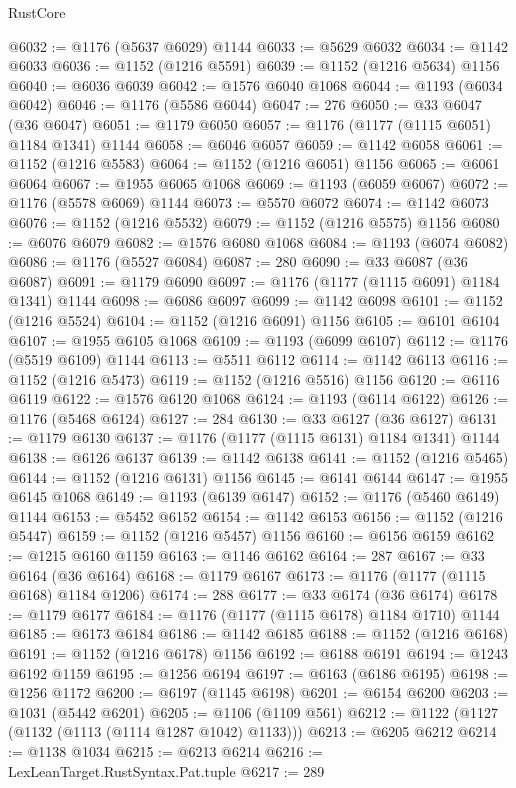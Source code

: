 \begin{lexlean}{RustCore}
\begin{coremodule}
@6032 := @1176 (@5637 @6029) @1144
@6033 := @5629 @6032
@6034 := @1142 @6033
@6036 := @1152 (@1216 @5591)
@6039 := @1152 (@1216 @5634) @1156
@6040 := @6036 @6039
@6042 := @1576 @6040 @1068
@6044 := @1193 (@6034 @6042)
@6046 := @1176 (@5586 @6044)
@6047 := 276
@6050 := @33 @6047 (@36 @6047)
@6051 := @1179 @6050
@6057 := @1176 (@1177 (@1115 @6051) @1184 @1341) @1144
@6058 := @6046 @6057
@6059 := @1142 @6058
@6061 := @1152 (@1216 @5583)
@6064 := @1152 (@1216 @6051) @1156
@6065 := @6061 @6064
@6067 := @1955 @6065 @1068
@6069 := @1193 (@6059 @6067)
@6072 := @1176 (@5578 @6069) @1144
@6073 := @5570 @6072
@6074 := @1142 @6073
@6076 := @1152 (@1216 @5532)
@6079 := @1152 (@1216 @5575) @1156
@6080 := @6076 @6079
@6082 := @1576 @6080 @1068
@6084 := @1193 (@6074 @6082)
@6086 := @1176 (@5527 @6084)
@6087 := 280
@6090 := @33 @6087 (@36 @6087)
@6091 := @1179 @6090
@6097 := @1176 (@1177 (@1115 @6091) @1184 @1341) @1144
@6098 := @6086 @6097
@6099 := @1142 @6098
@6101 := @1152 (@1216 @5524)
@6104 := @1152 (@1216 @6091) @1156
@6105 := @6101 @6104
@6107 := @1955 @6105 @1068
@6109 := @1193 (@6099 @6107)
@6112 := @1176 (@5519 @6109) @1144
@6113 := @5511 @6112
@6114 := @1142 @6113
@6116 := @1152 (@1216 @5473)
@6119 := @1152 (@1216 @5516) @1156
@6120 := @6116 @6119
@6122 := @1576 @6120 @1068
@6124 := @1193 (@6114 @6122)
@6126 := @1176 (@5468 @6124)
@6127 := 284
@6130 := @33 @6127 (@36 @6127)
@6131 := @1179 @6130
@6137 := @1176 (@1177 (@1115 @6131) @1184 @1341) @1144
@6138 := @6126 @6137
@6139 := @1142 @6138
@6141 := @1152 (@1216 @5465)
@6144 := @1152 (@1216 @6131) @1156
@6145 := @6141 @6144
@6147 := @1955 @6145 @1068
@6149 := @1193 (@6139 @6147)
@6152 := @1176 (@5460 @6149) @1144
@6153 := @5452 @6152
@6154 := @1142 @6153
@6156 := @1152 (@1216 @5447)
@6159 := @1152 (@1216 @5457) @1156
@6160 := @6156 @6159
@6162 := @1215 @6160 @1159
@6163 := @1146 @6162
@6164 := 287
@6167 := @33 @6164 (@36 @6164)
@6168 := @1179 @6167
@6173 := @1176 (@1177 (@1115 @6168) @1184 @1206)
@6174 := 288
@6177 := @33 @6174 (@36 @6174)
@6178 := @1179 @6177
@6184 := @1176 (@1177 (@1115 @6178) @1184 @1710) @1144
@6185 := @6173 @6184
@6186 := @1142 @6185
@6188 := @1152 (@1216 @6168)
@6191 := @1152 (@1216 @6178) @1156
@6192 := @6188 @6191
@6194 := @1243 @6192 @1159
@6195 := @1256 @6194
@6197 := @6163 (@6186 @6195)
@6198 := @1256 @1172
@6200 := @6197 (@1145 @6198)
@6201 := @6154 @6200
@6203 := @1031 (@5442 @6201)
@6205 := @1106 (@1109 @561)
@6212 := @1122 (@1127 (@1132 (@1113 (@1114 @1287 @1042) @1133)))
@6213 := @6205 @6212
@6214 := @1138 @1034
@6215 := @6213 @6214
@6216 := LexLeanTarget.RustSyntax.Pat.tuple
@6217 := 289

\end{coremodule}
\end{lexlean}
